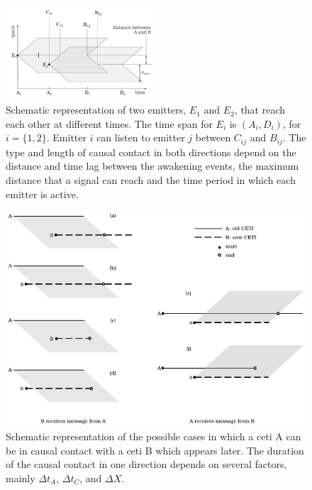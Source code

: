 \documentclass[useAMS,usenatbib]{mnras}
\begin{document}
  
\begin{figure}
   \centering
   \includegraphics[width=0.5\textwidth]{abcd.pdf}
   \caption{Schematic representation of two emitters, $E_1$ and $E_2$,
   that reach each other at different times.  The time span for $E_i$
   is $(A_i, D_i)$, for $i=\{1,2\}$.  Emitter $i$ can listen to
   emitter $j$ between $C_{ij}$ and $B_{ij}$.
   The type and length of causal contact in both directions depend on
   the distance and time lag between the awakening events, the maximum
   distance that a signal can reach and the time period in which each
   emitter is active.}
   \label{F_abcd}
\end{figure}

 
 
\begin{figure}
   \centering
   \includegraphics[width=\textwidth]{Messages_01.pdf}
   \caption{Schematic representation of the possible cases in which a
   ceti A can be in causal contact with a ceti B which appears later.
   The duration of the causal contact in one direction depends on
   several factors, mainly $\Delta t_A$, $\Delta t_C$, and $\Delta X$.}
   \label{F_messages}
\end{figure}
\end{document}

